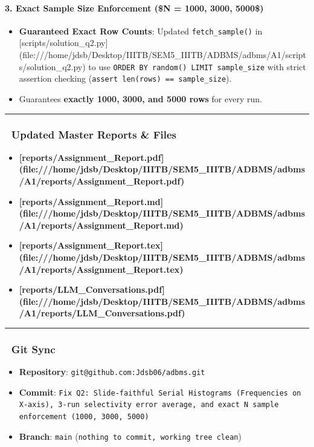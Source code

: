 \documentclass[11pt,a4paper]{article}
\begin{document}
\paragraph{3. Exact Sample Size Enforcement (\$N = 1000, 3000, 5000\$)}
\begin{itemize}
\item \textbf{Guaranteed Exact Row Counts}: Updated \texttt{fetch\_sample()} in [scripts/solution\_q2.py](file:///home/jdsb/Desktop/IIITB/SEM5\_IIITB/ADBMS/adbms/A1/scripts/solution\_q2.py) to use \texttt{ORDER BY random() LIMIT sample\_size} with strict assertion checking (\texttt{assert len(rows) == sample\_size}).
\item Guarantees \textbf{exactly 1000, 3000, and 5000 rows} for every run.
\end{itemize}

\hrule


\subsubsection{📄 Updated Master Reports \& Files}
\begin{itemize}
\item \textbf{[reports/Assignment\_Report.pdf](file:///home/jdsb/Desktop/IIITB/SEM5\_IIITB/ADBMS/adbms/A1/reports/Assignment\_Report.pdf)}
\item \textbf{[reports/Assignment\_Report.md](file:///home/jdsb/Desktop/IIITB/SEM5\_IIITB/ADBMS/adbms/A1/reports/Assignment\_Report.md)}
\item \textbf{[reports/Assignment\_Report.tex](file:///home/jdsb/Desktop/IIITB/SEM5\_IIITB/ADBMS/adbms/A1/reports/Assignment\_Report.tex)}
\item \textbf{[reports/LLM\_Conversations.pdf](file:///home/jdsb/Desktop/IIITB/SEM5\_IIITB/ADBMS/adbms/A1/reports/LLM\_Conversations.pdf)}
\end{itemize}

\hrule


\subsubsection{🐙 Git Sync}
\begin{itemize}
\item \textbf{Repository}: \texttt{git@github.com:Jdsb06/adbms.git}
\item \textbf{Commit}: \texttt{Fix Q2: Slide-faithful Serial Histograms (Frequencies on X-axis), 3-run selectivity error average, and exact N sample enforcement (1000, 3000, 5000)}
\item \textbf{Branch}: \texttt{main} (\texttt{nothing to commit, working tree clean})
\end{itemize}
\end{document}
